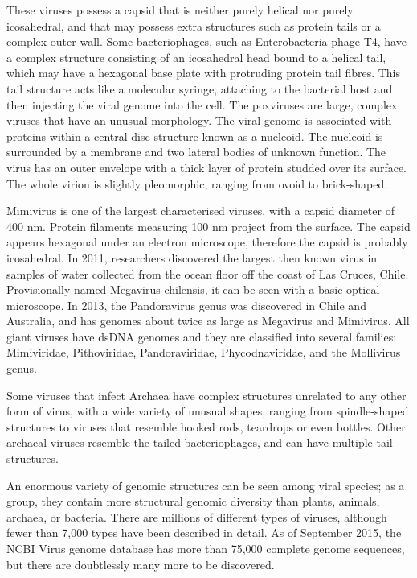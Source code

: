 These viruses possess a capsid that is neither purely helical nor purely icosahedral, and that may possess extra structures such as protein tails or a complex outer wall. Some bacteriophages, such as Enterobacteria phage T4, have a complex structure consisting of an icosahedral head bound to a helical tail, which may have a hexagonal base plate with protruding protein tail fibres. This tail structure acts like a molecular syringe, attaching to the bacterial host and then injecting the viral genome into the cell.
The poxviruses are large, complex viruses that have an unusual morphology. The viral genome is associated with proteins within a central disc structure known as a nucleoid. The nucleoid is surrounded by a membrane and two lateral bodies of unknown function. The virus has an outer envelope with a thick layer of protein studded over its surface. The whole virion is slightly pleomorphic, ranging from ovoid to brick-shaped.

Mimivirus is one of the largest characterised viruses, with a capsid diameter of 400 nm. Protein filaments measuring 100 nm project from the surface. The capsid appears hexagonal under an electron microscope, therefore the capsid is probably icosahedral. In 2011, researchers discovered the largest then known virus in samples of water collected from the ocean floor off the coast of Las Cruces, Chile. Provisionally named Megavirus chilensis, it can be seen with a basic optical microscope. In 2013, the Pandoravirus genus was discovered in Chile and Australia, and has genomes about twice as large as Megavirus and Mimivirus. All giant viruses have dsDNA genomes and they are classified into several families: Mimiviridae, Pithoviridae, Pandoraviridae, Phycodnaviridae, and the Mollivirus genus.

Some viruses that infect Archaea have complex structures unrelated to any other form of virus, with a wide variety of unusual shapes, ranging from spindle-shaped structures to viruses that resemble hooked rods, teardrops or even bottles. Other archaeal viruses resemble the tailed bacteriophages, and can have multiple tail structures.

An enormous variety of genomic structures can be seen among viral species; as a group, they contain more structural genomic diversity than plants, animals, archaea, or bacteria. There are millions of different types of viruses, although fewer than 7,000 types have been described in detail. As of September 2015, the NCBI Virus genome database has more than 75,000 complete genome sequences, but there are doubtlessly many more to be discovered.

